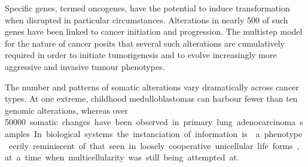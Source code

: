 \documentclass{tufte-book}
\begin{document}

Specific genes, termed oncogenes, have the potential to induce transformation
when disrupted in particular circumstances.  Alterations in nearly 500 of such
genes have been linked to cancer initiation and
progression.\cite{forbes_catalogue_2008} The multistep model for the nature of
cancer posits that several such alterations are cumulatively required in order
to initiate tumorigenesis and to evolve increasingly more aggressive and
invasive tumour phenotypes.\cite{vogelstein_multistep_1993}


The number and patterns of somatic alterations vary dramatically across cancer
types.  At one extreme, childhood medulloblastomas can harbour fewer than ten
genomic alterations, whereas over \SI{50000} somatic changes have been observed
in primary lung adenocarcinoma samples.

In biological systems the instanciation of information is .

a phenotype eerily reminiscent of that seen in loosely cooperative unicellular
life forms, at a time when multicellularity was still being attempted at.




\end{document}
